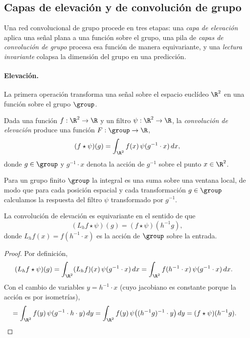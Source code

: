 \subsection{Capas de elevaci\'on y de convoluci\'on de grupo}
\label{sec:groups:lifting}

Una red convolucional de grupo procede en tres etapas: una \emph{capa de
elevaci\'on} aplica una se\~nal plana a una funci\'on sobre el grupo, una pila de
\emph{capas de convoluci\'on de grupo} procesa esa funci\'on de manera
equivariante, y una \emph{lectura invariante} colapsa la dimensi\'on del grupo en
una predicci\'on.

\paragraph{Elevaci\'on.}
La primera operaci\'on transforma una se\~nal sobre el espacio eucl\'ideo $\R^2$
en una funci\'on sobre el grupo $\group$.

\begin{definition}
\label{def:groups:lifting-convolution}
Dada una funci\'on $f: \R^2 \to \R$ y un filtro $\psi: \R^2 \to \R$, la
\emph{convoluci\'on de elevaci\'on} produce una funci\'on $F: \group \to \R$,
\begin{equation}
  (f \star \psi)(g) = \int_{\R^2} f(x)\,\psi(g^{-1} \cdot x)\,dx,
  \label{eq:groups:lifting-conv}
\end{equation}
donde $g \in \group$ y $g^{-1} \cdot x$ denota la acci\'on de $g^{-1}$ sobre el
punto $x \in \R^2$.
\end{definition}

Para un grupo finito $\group$ la integral es una suma sobre una ventana local, de
modo que para cada posici\'on espacial y cada transformaci\'on $g \in \group$
calculamos la respuesta del filtro $\psi$ transformado por $g^{-1}$.

\begin{theorem}
\label{thm:groups:lift-equivariance}
La convoluci\'on de elevaci\'on es equivariante en el sentido de que
\begin{equation}
  (L_h f \star \psi)(g) = (f \star \psi)(h^{-1} g),
\end{equation}
donde $L_h f(x) = f(h^{-1} \cdot x)$ es la acci\'on de $\group$ sobre la entrada.
\end{theorem}

\begin{proof}
Por definici\'on,
\begin{align}
  (L_h f \star \psi)(g)
  &= \int_{\R^2} (L_h f)(x)\,\psi(g^{-1} \cdot x)\,dx
   = \int_{\R^2} f(h^{-1} \cdot x)\,\psi(g^{-1} \cdot x)\,dx.
\end{align}
Con el cambio de variables $y = h^{-1} \cdot x$ (cuyo jacobiano es constante
porque la acci\'on es por isometr\'ias),
\begin{align}
  &= \int_{\R^2} f(y)\,\psi(g^{-1} \cdot h \cdot y)\,dy
   = \int_{\R^2} f(y)\,\psi\big((h^{-1} g)^{-1} \cdot y\big)\,dy
   = (f \star \psi)(h^{-1} g). \qedhere
\end{align}
\end{proof}

